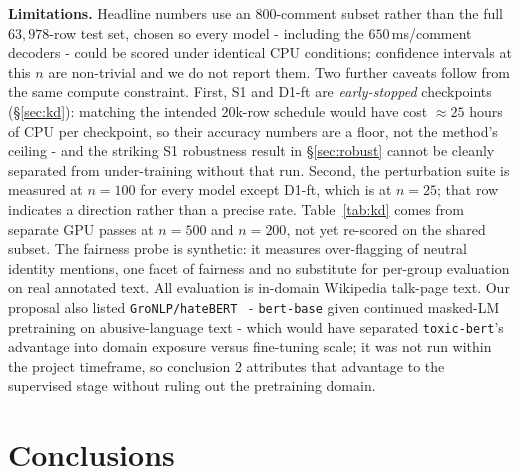 \documentclass[10pt,a4paper]{article}
\begin{document}
\textbf{Limitations.} Headline numbers use an $800$-comment subset rather than the
full $63{,}978$-row test set, chosen so every model - including the
$650$\,ms/comment decoders - could be scored under identical CPU conditions;
confidence intervals at this $n$ are non-trivial and we do not report them.
Two further caveats follow from the same compute constraint. First, S1 and D1-ft
are \emph{early-stopped} checkpoints (\S\ref{sec:kd}): matching the intended
$20$k-row schedule would have cost ${\approx}25$ hours of CPU per checkpoint, so
their accuracy numbers are a floor, not the method's ceiling - and the striking
S1 robustness result in \S\ref{sec:robust} cannot be cleanly separated from
under-training without that run. Second, the perturbation suite is measured at
$n{=}100$ for every model except D1-ft, which is at $n{=}25$; that row indicates
a direction rather than a precise rate.
Table~\ref{tab:kd} comes from separate GPU passes at $n{=}500$ and $n{=}200$, not yet
re-scored on the shared subset. The fairness probe is synthetic: it measures
over-flagging of neutral identity mentions, one facet of fairness and no substitute
for per-group evaluation on real annotated text. All evaluation is in-domain Wikipedia talk-page text. Our proposal also listed
\texttt{GroNLP/hateBERT}~\cite{caselli2021} - \texttt{bert-base} given continued
masked-LM pretraining on abusive-language text - which would have separated
\texttt{toxic-bert}'s advantage into domain exposure versus fine-tuning scale; it was not
run within the project timeframe, so conclusion 2 attributes that advantage to the
supervised stage without ruling out the pretraining domain.

\section{Conclusions}
\label{sec:conclusions}
\end{document}
